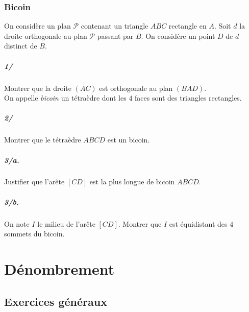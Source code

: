 		\subsection{Bicoin}
		
			On considère un plan $\mathcal{P}$ contenant un triangle $ABC$ rectangle en $A$. Soit $d$ la droite orthogonale au plan $\mathcal{P}$ passant par $B$. On considère un point $D$ de $d$ distinct de $B$.
			
			\paragraph{1/}
				
				Montrer que la droite $(AC)$ est orthogonale au plan $(BAD)$. \\
				
			On appelle \emph{bicoin} un tétraèdre dont les $4$ faces sont des triangles rectangles.
			
			\paragraph{2/}
			
				Montrer que le tétraèdre $ABCD$ est un bicoin.
				
			\paragraph{3/a.} 
			
				Justifier que l'arête $[CD]$ est la plus longue de bicoin $ABCD$.
				
			\paragraph{3/b.}
			
				On note $I$ le milieu de l'arête $[CD]$. Montrer que $I$ est équidistant des $4$ sommets du bicoin.


\chapter{Dénombrement}


	\section{Exercices généraux}

		\subsection{}

